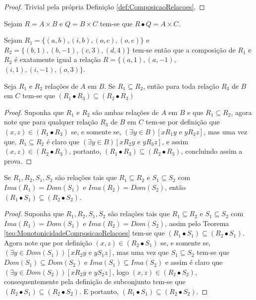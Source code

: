 \begin{proof}
	Trivial pela própria Definição \ref{def:ComposicaoRelacoes}.
\end{proof}

\begin{example}
	Sejam $R = A \times B$ e $Q = B \times C$ tem-se que $R \bullet Q = A \times C$.
\end{example}

\begin{example}
	Sejam $R_1 = \{(a, b), (i, b), (o, c), (o, e)\}$ e $R_2 = \{(b, 1), (b, -1), (c, 3), (d, 4)\}$ tem-se então que a composição de $R_1$ e $R_2$ é exatamente igual a relação $R = \{(a, 1), (a, -1),$ $(i, 1), (i, -1), (o, 3)\}$.
\end{example}

\begin{theorem}\label{teo:MonotonicidadeComposicaoRelacoes}
	Seja $R_1$ e $R_2$ relações de $A$ em $B$. Se $R_1 \subseteq R_2$, então para toda relação $R_3$ de $B$ em $C$ tem-se que $(R_1 \bullet R_3) \subseteq (R_2 \bullet R_3)$
\end{theorem}

\begin{proof}
	Suponha que $R_1$ e $R_2$ são ambas relações de $A$ em $B$ e que $R_1 \subseteq R_2$, agora note que para qualquer relação $R_3$ de $B$ em $C$ tem-se por definição que $(x, z) \in (R_1 \bullet R_3)$ se, e somente se, $(\exists y \in B)[x\mathrel{R_1}y \text{ e } y\mathrel{R_3}z]$, mas uma vez que, $R_1 \subseteq R_2$ é claro que $ (\exists y \in B)[x \mathrel{R_2}y \text{ e } y\mathrel{R_3}z]$, e assim $(x, z) \in (R_2 \bullet R_3)$, portanto, $(R_1 \bullet R_3) \subseteq (R_2 \bullet R_3)$, concluindo assim a prova.
\end{proof}

\begin{corollary}\label{col:MonotonicidadeComposicaoRelacoes}
	Se $R_1, R_2, S_1, S_2$ são relações tais que $R_1 \subseteq R_2$ e $S_1 \subseteq S_2$ com $Ima(R_1) = Dom(S_1)$ e $Ima(R_2) = Dom(S_2)$, então $(R_1 \bullet S_1) \subseteq (R_2 \bullet S_2)$.
\end{corollary}

\begin{proof}
	Suponha que $R_1, R_2, S_1, S_2$ são relações tais que $R_1 \subseteq R_2$ e $S_1 \subseteq S_2$ com $Ima(R_1) = Dom(S_1)$ e $Ima(R_2) = Dom(S_2)$, assim pelo Teorema \ref{teo:MonotonicidadeComposicaoRelacoes} tem-se que $(R_1 \bullet S_1) \subseteq (R_2 \bullet S_1)$. Agora note que por definição $(x, z) \in (R_2 \bullet S_1)$ se, e somente se, $(\exists y \in Dom(S_1))[x\mathrel{R_2}y \text{ e } y\mathrel{S_1}z]$, mas uma vez que $S_1 \subseteq S_2$ tem-se que $Dom(S_1) \subseteq Dom(S_2)$ e $Ima(S_1) \subseteq Ima(S_2)$ e assim é claro que $(\exists y \in Dom(S_2))[x\mathrel{R_2}y \text{ e } y\mathrel{S_2}z]$, logo $(x, z) \in (R_2 \bullet S_2)$, consequentemente pela definição de subconjunto tem-se que $(R_2 \bullet S_1) \subseteq (R_2 \bullet S_2)$. E portanto, $(R_1 \bullet S_1) \subseteq (R_2 \bullet S_2)$.
\end{proof}

